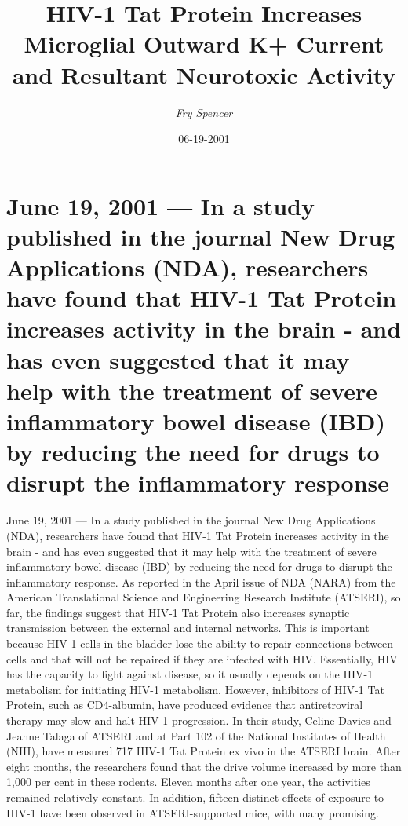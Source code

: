 \documentclass{article}%
\title{HIV{-}1 Tat Protein Increases Microglial Outward K+ Current and Resultant Neurotoxic Activity}%
\author{\textit{Fry Spencer}}%
\date{06-19-2001}%
\begin{document}
%
\normalsize%
\maketitle%
\section{June 19, 2001 — In a study published in the journal New Drug Applications (NDA), researchers have found that HIV{-}1 Tat Protein increases activity in the brain {-} and has even suggested that it may help with the treatment of severe inflammatory bowel disease (IBD) by reducing the need for drugs to disrupt the inflammatory response}%
\label{sec:June19,2001InastudypublishedinthejournalNewDrugApplications(NDA),researchershavefoundthatHIV{-}1TatProteinincreasesactivityinthebrain{-}andhasevensuggestedthatitmayhelpwiththetreatmentofsevereinflammatoryboweldisease(IBD)byreducingtheneedfordrugstodisrupttheinflammatoryresponse}%
June 19, 2001 — In a study published in the journal New Drug Applications (NDA), researchers have found that HIV{-}1 Tat Protein increases activity in the brain {-} and has even suggested that it may help with the treatment of severe inflammatory bowel disease (IBD) by reducing the need for drugs to disrupt the inflammatory response. As reported in the April issue of NDA (NARA) from the American Translational Science and Engineering Research Institute (ATSERI), so far, the findings suggest that HIV{-}1 Tat Protein also increases synaptic transmission between the external and internal networks. This is important because HIV{-}1 cells in the bladder lose the ability to repair connections between cells and that will not be repaired if they are infected with HIV. Essentially, HIV has the capacity to fight against disease, so it usually depends on the HIV{-}1 metabolism for initiating HIV{-}1 metabolism. However, inhibitors of HIV{-}1 Tat Protein, such as CD4{-}albumin, have produced evidence that antiretroviral therapy may slow and halt HIV{-}1 progression.\newline%
In their study, Celine Davies and Jeanne Talaga of ATSERI and at Part 102 of the National Institutes of Health (NIH), have measured 717 HIV{-}1 Tat Protein ex vivo in the ATSERI brain. After eight months, the researchers found that the drive volume increased by more than 1,000 per cent in these rodents. Eleven months after one year, the activities remained relatively constant. In addition, fifteen distinct effects of exposure to HIV{-}1 have been observed in ATSERI{-}supported mice, with many promising.\newline%
\end{document}
